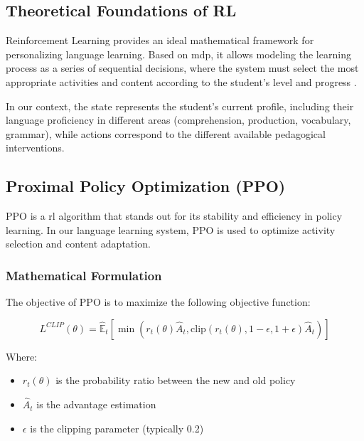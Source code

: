 \subsection{Theoretical Foundations of RL}

Reinforcement Learning provides an ideal mathematical framework for personalizing language learning. Based on \gls{mdp}, it allows modeling the learning process as a series of sequential decisions, where the system must select the most appropriate activities and content according to the student's level and progress \cite{williams2017educational}.

In our context, the state represents the student's current profile, including their language proficiency in different areas (comprehension, production, vocabulary, grammar), while actions correspond to the different available pedagogical interventions.

\subsection{Proximal Policy Optimization (PPO)}

PPO \cite{schulman2017proximal} is a \gls{rl} algorithm that stands out for its stability and efficiency in policy learning. In our language learning system, PPO is used to optimize activity selection and content adaptation.


\subsubsection{Mathematical Formulation}
The objective of PPO is to maximize the following objective function:

\begin{equation}
  L^{CLIP}(\theta) = \hat{\mathbb{E}}_t[\min(r_t(\theta)\hat{A}_t, \text{clip}(r_t(\theta), 1-\epsilon, 1+\epsilon)\hat{A}_t)]
\end{equation}

Where:

\begin{itemize}
  \item $r_t(\theta)$ is the probability ratio between the new and old policy
  \item $\hat{A}_t$ is the advantage estimation
  \item $\epsilon$ is the clipping parameter (typically 0.2)
\end{itemize}



